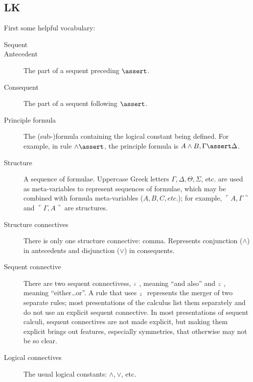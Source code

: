 \documentclass{article}
\begin{document}

\subsection{LK}

First some helpful vocabulary:

\begin{description}
\item[Sequent]
  \item[Antecedent] The part of a sequent preceding \(\linfer\).
  \item[Consequent] The part of a sequent following \(\linfer\).
  \item[Principle formula] The (sub-)formula containing the logical
    constant being defined. For example, in rule \(\land\linfer\), the
    principle formula is \mbox{\(A\land B,\Gamma\linfer \Delta\)}.
  \item[Structure] A sequence of formulae. Uppercase Greek letters
    \(\Gamma, \Delta, \Theta, \Sigma\), etc. are used as
    meta-variables to represent sequences of formulae, which may be
    combined with formula meta-variables (\(A, B, C, etc.\)); for
    example, \(\ulcorner A,\Gamma\urcorner\) and \(\ulcorner \Gamma,
    A\urcorner\) are structures.
    \item[Structure connectives] There is only one structure
      connective: comma. Represents conjunction (\(\land\)) in
      antecedents and disjunction (\(\lor\)) in consequents.
    \item[Sequent connective] There are two sequent connectivess,
      \(\scriptscriptstyle\barwedge\ \), meaning ``and also'' and \(\scriptscriptstyle\veebar\ \), meaning
      ``either\ldots or''. A rule that uses \(\scriptscriptstyle\veebar\ \) represents the
      merger of two separate rules; most presentations of the calculus
      list them separately and do not use an explicit sequent
      connective. In most presentations of sequent calculi, sequent
      connectives are not made explicit, but making them explicit
      brings out features, especially symmetries, that otherwise may
      not be so clear.
    \item[Logical connectives] The usual logical constants: \(\land,
      \lor\), etc.
\end{description}
\end{document}
